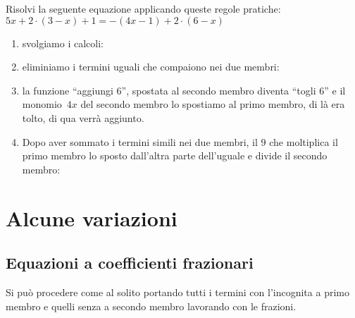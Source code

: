 \begin{esempio}{}{}
Risolvi la seguente equazione applicando queste regole pratiche: \qquad
\(5x+2\cdot (3-x)+1=-(4x-1)+2\cdot (6-x)\)

\vspace{.5em}
\begin{enumerate}
\item svolgiamo i calcoli:\\
\item eliminiamo i termini uguali che compaiono nei due membri:\\
\item la funzione ``aggiungi \(6\)'', spostata al secondo membro diventa 
``togli \(6\)'' e il monomio~\(4x\) del secondo membro lo spostiamo al 
primo membro, di là era tolto, di qua verrà aggiunto.\\
\item Dopo aver sommato i termini simili nei due membri, il 
\(9\) che moltiplica il primo membro lo sposto dall'altra parte 
dell'uguale e divide il secondo membro:\\
\end{enumerate}
\end{esempio}

\section{Alcune variazioni}
\label{sec:eq1_varie}

\subsection{Equazioni a coefficienti frazionari}
\label{sec:13_coefffraz} 

Si può procedere come al solito portando tutti i termini con l'incognita a 
primo membro e quelli senza a secondo membro lavorando con le frazioni.

